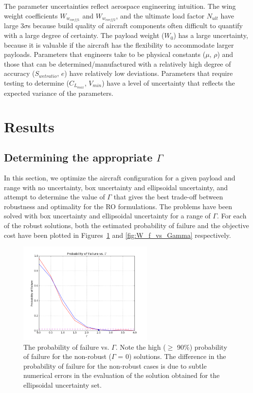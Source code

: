 \documentclass{article}
\begin{document}
The parameter uncertainties reflect aerospace engineering intuition. The wing weight coefficients $W_{w_{coeff1}}$ and $W_{w_{coeff2}}$, and the ultimate load factor $N_{ult}$ have large $3\sigma$s because build quality of aircraft components often difficult to quantify with a large degree of certainty. The payload weight ($W_0$) has a large uncertainty, because it is valuable if the aircraft has the flexibility to accommodate larger payloads. Parameters that engineers take to be physical constants ($\mu$, $\rho$) and those that can be determined/manufactured with a relatively high degree of accuracy ($S_{wetratio}$, $e$) have relatively low deviations. Parameters that require testing to determine ($C_{L_{max}}$, $V_{min}$) have a level of uncertainty that reflects the expected variance of the parameters. 

\section{Results}

\subsection{Determining the appropriate $\Gamma$}

In this section, we optimize the aircraft configuration for a given payload and range with no uncertainty, box uncertainty and ellipsoidal uncertainty, and attempt to determine the value of $\Gamma$ that gives the best trade-off between robustness and optimality for the RO formulations. The problems have been solved with box uncertainty and ellipsoidal uncertainty for a range of $\Gamma$. For each of the robust solutions, both the estimated probability of failure and the objective cost have been plotted in Figures~\ref{fig:probOfFail_vs_Gamma} and \ref{fig:W_f_vs_Gamma} respectively. 

\begin{figure}[h]
    \centering
    \includegraphics[width=0.6\textwidth]{probOfFail_vs_Gamma.png}
    \caption{The probability of failure vs. $\Gamma$. Note the high ($\geq$ 90\%) probability of failure for the non-robust ($\Gamma$ = 0) solutions. The difference in the probability of failure for the non-robust cases is due to subtle numerical errors in the evaluation of the solution obtained for the ellipsoidal uncertainty set.}
    \label{fig:probOfFail_vs_Gamma}
\end{figure}
\end{document}
